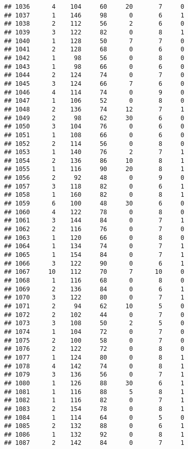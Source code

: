 \documentclass[
]{article}
\begin{document}
\begin{verbatim}
## 1036      4    104     60     20       7     0
## 1037      1    146     98      0       6     1
## 1038      2    112     56      2       6     0
## 1039      3    122     82      0       8     1
## 1040      1    128     50      7       7     0
## 1041      2    128     68      0       6     0
## 1042      1     98     56      0       8     0
## 1043      1     98     66      0       6     0
## 1044      2    124     74      0       7     0
## 1045      3    124     66      7       6     0
## 1046      4    114     74      0       9     0
## 1047      1    106     52      0       8     0
## 1048      2    136     74     12       7     1
## 1049      2     98     62     30       6     0
## 1050      3    104     76      0       6     0
## 1051      1    108     66      0       6     0
## 1052      2    114     56      0       8     0
## 1053      1    140     76      2       7     1
## 1054      2    136     86     10       8     1
## 1055      1    116     90     20       8     1
## 1056      2     92     48      0       9     0
## 1057      3    118     82      0       6     1
## 1058      1    160     82      0       8     1
## 1059      6    100     48     30       6     0
## 1060      4    122     78      0       8     0
## 1061      3    144     84      0       7     1
## 1062      2    116     76      0       7     0
## 1063      1    120     66      0       8     0
## 1064      1    134     74      0       7     1
## 1065      1    154     84      0       7     1
## 1066      3    122     90      0       6     1
## 1067     10    112     70      7      10     0
## 1068      1    116     68      0       8     0
## 1069      2    136     84      0       6     1
## 1070      3    122     80      0       7     1
## 1071      2     94     62     10       5     0
## 1072      2    102     44      0       7     0
## 1073      3    108     50      2       5     0
## 1074      1    104     72      0       7     0
## 1075      2    100     58      0       7     0
## 1076      2    122     72      0       8     0
## 1077      1    124     80      0       8     1
## 1078      4    142     74      0       8     1
## 1079      3    136     56      0       7     1
## 1080      1    126     88     30       6     1
## 1081      1    116     88      5       8     1
## 1082      1    116     82      0       7     1
## 1083      2    154     78      0       8     1
## 1084      1    114     64      0       5     0
## 1085      2    132     88      0       6     1
## 1086      1    132     92      0       8     1
## 1087      2    142     84      0       7     1

\end{verbatim}
\end{document}
